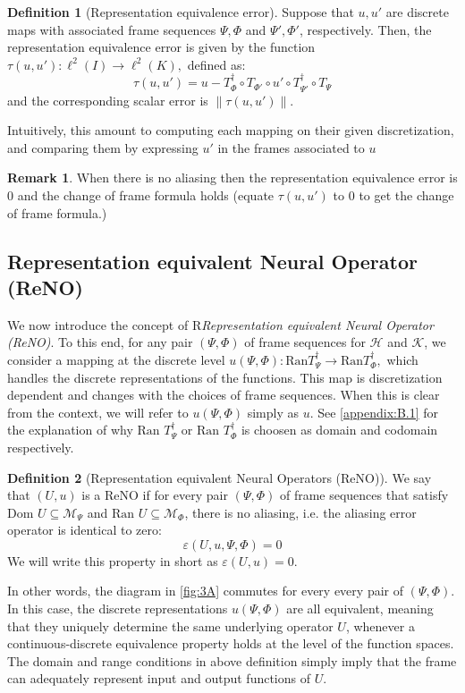 \documentclass[reqno,10pt]{amsart}
\theoremstyle{plain}
\theoremstyle{definition}
\newtheorem{defn}{Definition}
\newtheorem{rem}{Remark}
\newcommand{\cal}[1]{\mathcal{#1}}
\begin{document}
    \begin{defn}[Representation equivalence error] Suppose that $u,u'$ are discrete maps with associated frame sequences $\Psi,\Phi$ and $\Psi',\Phi'$, respectively. Then, the representation equivalence error is given by the function $\tau(u,u') : \ell^2(I) \to \ell^2(K),$ defined as:
    $$ \tau(u,u') = u - T^\dag_\Phi \circ T_{\Phi'} \circ u' \circ T_{\Psi'}^\dag \circ T_\Psi$$
    and the corresponding scalar error is $\|\tau(u,u')\|$.
    \end{defn}
    \noindent Intuitively, this amount to computing each mapping on their given discretization, and comparing them by expressing $u'$ in the frames associated to $u$
    \begin{rem}\label{change_frame}
        When there is no aliasing then the representation equivalence error is $0$ and the change of frame formula holds (equate $\tau(u,u')$ to $0$ to get the change of frame formula.)
    \end{rem}

    \subsection{Representation equivalent Neural Operator (ReNO)}
    We now introduce the concept of R{\it Representation equivalent Neural Operator (ReNO)}. To this end, for any pair $(\Psi,\Phi)$ of frame sequences for $\cal H$ and $\cal K$, we consider a mapping at the discrete level $u(\Psi,\Phi) : \text{Ran}T^\dag_\Psi \to \text{Ran}T^\dag_\Phi,$ which handles the discrete representations of the functions. This map is discretization dependent and changes with the choices of frame sequences. When this is clear from the context, we will refer to $u(\Psi,\Phi)$ simply as $u$. See \ref{appendix:B.1} for the explanation of why $\text{Ran }T^\dag_\Psi$ or $\text{Ran }T^\dag_\Phi$ is choosen as domain and codomain respectively.

    \begin{defn}[Representation equivalent Neural Operators (ReNO)] \label{def:ReNO}
        We say that $(U,u)$ is a ReNO if for every pair $(\Psi,\Phi)$ of frame sequences that satisfy $\text{Dom }U \subseteq \cal M_\Psi$ and $\text{Ran }U \subseteq \cal M_\Phi$, there is no aliasing, i.e. the aliasing error operator is identical to zero:
        \begin{equation}
            \varepsilon (U,u,\Psi,\Phi) = 0
        \end{equation} 
        We will write this property in short as $\varepsilon(U,u) = 0$.
    \end{defn}
    \noindent In other words, the diagram in \ref{fig:3A} commutes for every every pair of $(\Psi,\Phi)$. In this case, the discrete representations $u(\Psi,\Phi)$ are all equivalent, meaning that they uniquely determine the same underlying operator $U$, whenever a continuous-discrete equivalence property holds at the level of the function spaces. The domain and range conditions in above definition simply imply that the frame can adequately represent input and output functions of $U$.
\end{document}
